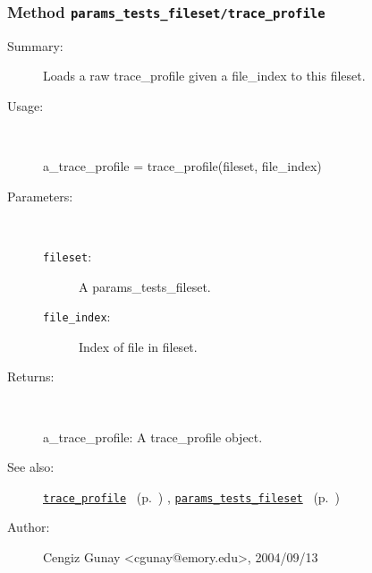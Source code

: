 \subsubsection[Method \texttt{trace\_profile}]{Method \texttt{params\_tests\_fileset/trace\_profile}}%
%
\label{ref_params_tests_fileset__trace_profile}%
\hypertarget{ref_params_tests_fileset__trace_profile}{}%
\begin{description}
\item[Summary:]Loads a raw trace\_profile given a file\_index to this fileset.
%
\item[Usage:]~%
\begin{lyxcode}%
a\_trace\_profile = trace\_profile(fileset, file\_index)
%
\end{lyxcode}%
%
%
\item[Parameters:]~
\begin{description}%
\item[\texttt{fileset}:]
 A params\_tests\_fileset.
\item[\texttt{file\_index}:]
 Index of file in fileset.
\end{description}%
%
\item[Returns:]~

	a\_trace\_profile: A trace\_profile object.
%
%
\item[See also:]%
\hyperlink{ref_trace_profile}{\texttt{trace\_profile}}%
\ (p.~\pageref{ref_trace_profile})%
%
, \hyperlink{ref_params_tests_fileset}{\texttt{params\_tests\_fileset}}%
\ (p.~\pageref{ref_params_tests_fileset})%
%
%
\item[Author:]%
Cengiz Gunay <cgunay@emory.edu>, 2004/09/13%
\end{description}
\methodline%
